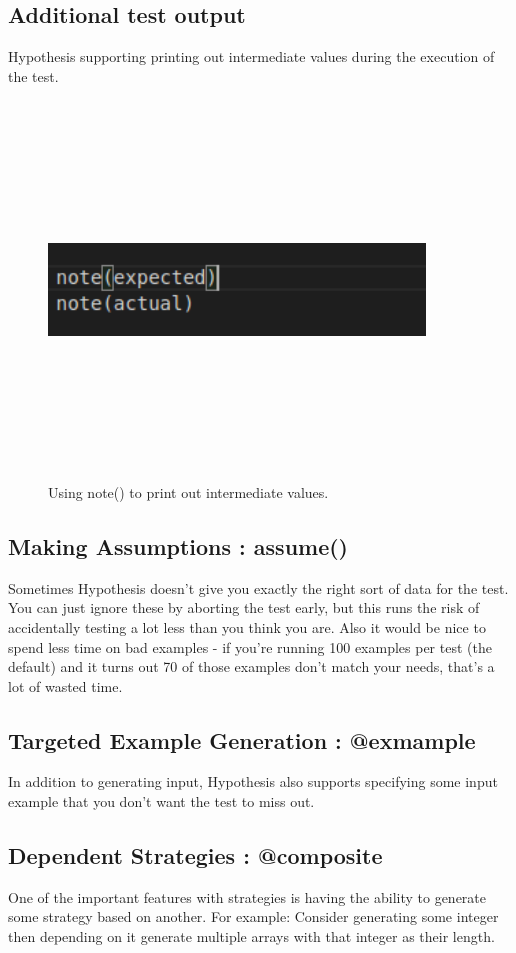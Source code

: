 \documentclass[12pt]{article}
\begin{document}
{\subsection{Additional test output}
Hypothesis supporting printing out intermediate values during the execution of the test.
 \begin{figure}[H]
 	\includegraphics[width=10cm,height=10cm,keepaspectratio]{note.png}
 	\caption{Using note() to print out intermediate values.}
 	\label{fig 3: note.}
 \end{figure}

\subsection{Making Assumptions : assume()}
Sometimes Hypothesis doesn’t give you exactly the right sort of data for the test. You can just ignore these by aborting the test early, but this runs the risk of accidentally testing a lot less than you think you are. Also it would be nice to spend less time on bad examples - if you’re running 100 examples per test (the default) and it turns out 70 of those examples don’t match your needs, that’s a lot of wasted time.
\subsection{Targeted Example Generation : @exmample}
In addition to generating input, Hypothesis also supports specifying some input example that you don't want the test to miss out. 
\subsection{Dependent Strategies : @composite}
One of the important features with strategies is having the ability to generate some strategy based on another. For example: Consider generating some integer then depending on it generate multiple arrays with that integer as their length.
}
\end{document}
